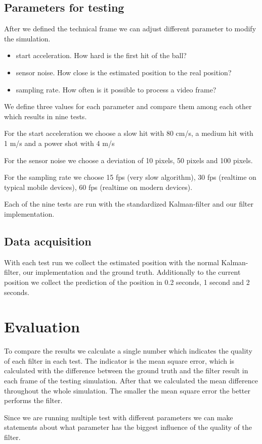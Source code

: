 \documentclass[titlepage, a4paper, 11pt]{scrartcl}
\begin{document}
        \subsection{Parameters for testing}

        After we defined the technical frame we can adjust different parameter to modify the simulation.

        \begin{itemize}
            \item start acceleration. How hard is the first hit of the ball?
            \item sensor noise. How close is the estimated position to the real position?
            \item sampling rate. How often is it possible to process a video frame?
        \end{itemize}

        We define three values for each parameter and compare them among each other which results in nine tests.

        For the start acceleration we choose a slow hit with 80 cm/s, a medium hit with 1 m/s and a power shot with 4 m/s \cite{ballspeed}

        For the sensor noise we choose a deviation of 10 pixels, 50 pixels and 100 pixels.

        For the sampling rate we choose 15 fps (very slow algorithm), 30 fps (realtime on typical mobile devices), 60 fps (realtime on modern devices).

        Each of the nine tests are run with the standardized Kalman-filter and our filter implementation.

        \subsection{Data acquisition}

        With each test run we collect the estimated position with the normal Kalman-filter, our implementation and the ground truth.
        Additionally to the current position we collect the prediction of the position in 0.2 seconds, 1 second and 2 seconds.

    \section{Evaluation}

    To compare the results we calculate a single number which indicates the quality of each filter in each test.
    The indicator is the mean square error, which is calculated with the difference between the ground truth and the filter result in each frame of the testing simulation.
    After that we calculated the mean difference throughout the whole simulation.
    The smaller the mean square error the better performs the filter.

    Since we are running multiple test with different parameters we can make statements about what parameter has the biggest influence of the quality of the filter. 


     
    
\end{document}

